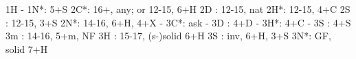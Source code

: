 1H - 1N*: 5+S
2C*: 16+, any; or 12-15, 6+H
2D : 12-15, nat
2H*: 12-15, 4+C
2S : 12-15, 3+S
2N*: 14-16, 6+H, 4+X
   - 3C*: ask
        - 3D : 4+D
        - 3H*: 4+C
        - 3S : 4+S
3m : 14-16, 5+m, NF
3H : 15-17, (s-)solid 6+H
3S : inv, 6+H, 3+S
3N*: GF, solid 7+H